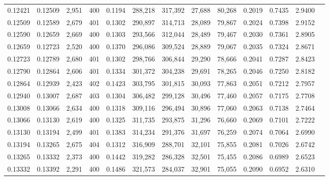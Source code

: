 \begin{tabular}{rrrrrrrrrrrrr}
0.12421 & 0.12509 &  2,951 & 400 &                                     0.1194 & 288,218 & 317,392 &  27,688 &  80,268 & 0.2019 & 0.7435 & 2.9400 \\
0.12509 & 0.12589 &  2,679 & 401 &                                     0.1302 & 290,897 & 314,713 &  28,089 &  79,867 & 0.2024 & 0.7398 & 2.9152 \\
0.12590 & 0.12659 &  2,669 & 400 &                                     0.1303 & 293,566 & 312,044 &  28,489 &  79,467 & 0.2030 & 0.7361 & 2.8905 \\
0.12659 & 0.12723 &  2,520 & 400 &                                     0.1370 & 296,086 & 309,524 &  28,889 &  79,067 & 0.2035 & 0.7324 & 2.8671 \\
0.12723 & 0.12789 &  2,680 & 401 &                                     0.1302 & 298,766 & 306,844 &  29,290 &  78,666 & 0.2041 & 0.7287 & 2.8423 \\
0.12790 & 0.12864 &  2,606 & 401 &                                     0.1334 & 301,372 & 304,238 &  29,691 &  78,265 & 0.2046 & 0.7250 & 2.8182 \\
0.12864 & 0.12939 &  2,423 & 402 &                                     0.1423 & 303,795 & 301,815 &  30,093 &  77,863 & 0.2051 & 0.7212 & 2.7957 \\
0.12940 & 0.13007 &  2,687 & 403 &                                     0.1304 & 306,482 & 299,128 &  30,496 &  77,460 & 0.2057 & 0.7175 & 2.7708 \\
0.13008 & 0.13066 &  2,634 & 400 &                                     0.1318 & 309,116 & 296,494 &  30,896 &  77,060 & 0.2063 & 0.7138 & 2.7464 \\
0.13066 & 0.13130 &  2,619 & 400 &                                     0.1325 & 311,735 & 293,875 &  31,296 &  76,660 & 0.2069 & 0.7101 & 2.7222 \\
0.13130 & 0.13194 &  2,499 & 401 &                                     0.1383 & 314,234 & 291,376 &  31,697 &  76,259 & 0.2074 & 0.7064 & 2.6990 \\
0.13194 & 0.13265 &  2,675 & 404 &                                     0.1312 & 316,909 & 288,701 &  32,101 &  75,855 & 0.2081 & 0.7026 & 2.6742 \\
0.13265 & 0.13332 &  2,373 & 400 &                                     0.1442 & 319,282 & 286,328 &  32,501 &  75,455 & 0.2086 & 0.6989 & 2.6523 \\
0.13332 & 0.13392 &  2,291 & 400 &                                     0.1486 & 321,573 & 284,037 &  32,901 &  75,055 & 0.2090 & 0.6952 & 2.6310 \\

\end{tabular}
